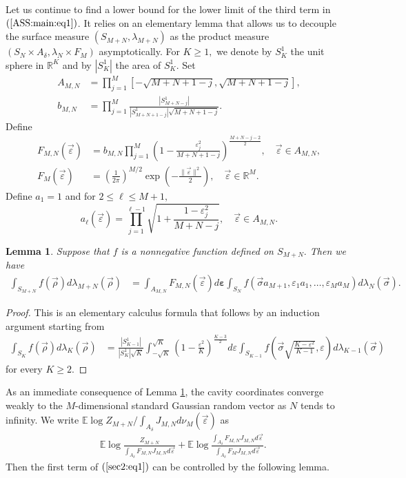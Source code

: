 \documentclass[12pt]{article}
\newcommand{\veps}{\vec{\varepsilon}}
\newcommand{\vsi}{{\vec{\sigma}}}
\newcommand{\vrho}{{\vec{\rho}}}
\newtheorem{lemma}{\bf Lemma}
\newenvironment{Proof of lemma}{\noindent{\bf Proof of Lemma}}{\hfill$\Box$\newline}
\newenvironment{Proof of theorem}{\noindent{\bf Proof of Theorem}}{\hfill{\footnotesize${\square}$}\newline}
\newenvironment{Proof of theorems}{\noindent{\bf Proof of Theorems}}{\hfill$\Box$\newline}
\newenvironment{Proof of proposition}{\noindent{\bf Proof of Proposition}}{\hfill$\Box$\newline}
\newenvironment{Proof of propositions}{\noindent{\bf Proof of Propositions}}{\hfill$\Box$\newline}
\newenvironment{Proof of exercise}{\noindent{\it Proof of Exercise:}}{\hfill$\Box$}
\numberwithin{equation}{section}
\begin{document}
\noindent Let us continue to find a lower bound for the lower limit of the third term in $(\ref{ASS:main:eq1})$. 
It relies on an elementary lemma that allows us to decouple the surface measure $(S_{M+N},\lambda_{M+N})$ as the product measure $(S_N\times A_\delta,\lambda_N\times F_M)$ asymptotically.
For $K\geq 1,$ we denote by $S_K^1$ the unit sphere in $\mathbb{R}^K$ and by $|S_K^1|$ the area of $S_K^1$.
Set
\begin{align*}
A_{M,N}&=\prod_{j=1}^M\left[-\sqrt{M+N+1-j},\sqrt{M+N+1-j}\right],\\
b_{M,N}&=\prod_{j=1}^M\frac{|S_{M+N-j}^1|}{|S_{M+N+1-j}^1|\sqrt{M+N+1-j}}.
\end{align*}
Define
\begin{align*}
F_{M,N}(\veps)&=b_{M,N}\prod_{j=1}^M\left(1-\frac{\varepsilon_j^2}{M+N+1-j}\right)^{\frac{M+N-j-2}{2}},\quad\veps\in A_{M,N},\\
F_M(\veps)&=\left(\frac{1}{2\pi}\right)^{M/2}\exp\left(-\frac{\|\veps\|^2}{2}\right),\quad\veps\in \mathbb{R}^M.
\end{align*}
Define $a_1=1$ and for $2\leq \ell\leq M+1,$
$$
a_\ell(\veps)=\prod_{j=1}^{\ell-1}\sqrt{1+\frac{1-\varepsilon_j^2}{M+N-j}},\quad \veps\in A_{M,N}.
$$

\begin{lemma}
\label{ASS:lem1}
Suppose that $f$ is a nonnegative function defined on $S_{M+N}.$ 
Then we have 
\begin{align}\label{ASS:lem1:eq1}
\int_{S_{M+N}}f(\vrho)d\lambda_{M+N}(\vrho)
&=\int_{A_{M,N}}
F_{M,N}(\veps)d\boldsymbol{\varepsilon}\int_{S_N}f\left(\vsi a_{M+1},\varepsilon_{1}a_{1},\ldots,\varepsilon_Ma_M\right)d\lambda_{N}(\vsi).
\end{align}
\end{lemma}

\begin{proof}
This is an elementary calculus formula that follows by an induction argument starting from  
\begin{align*}
\int_{S_K}f(\vrho)d\lambda_K(\vrho)&=\frac{|S_{K-1}^1|}{|S_K^1|\sqrt{K}}\int_{-\sqrt{K}}^{\sqrt{K}}\left(1-\frac{\varepsilon^2}{K}\right)^{\frac{K-3}{2}}d\varepsilon \int_{S_{K-1}}f\left(\vsi \sqrt{\frac{K-\varepsilon^2}{K-1}},\varepsilon\right)d\lambda_{K-1}(\vsi)
\end{align*}
for every $K\geq 2.$
\end{proof}

\noindent As an immediate consequence of Lemma \ref{ASS:lem1}, the cavity coordinates converge weakly to the $M$-dimensional standard Gaussian random vector as $N$ tends to infinity. We write $\mathbb{E}\log {Z_{M+N}}/{\int_{A_\delta}J_{M,N}d\nu_M(\veps)}$ as
\begin{align}\label{sec2:eq1}
&\mathbb{E}\log \frac{Z_{M+N}}{\int_{A_\delta}F_{M,N}J_{M,N}d\veps}+\mathbb{E}\log \frac{\int_{A_\delta}F_{M,N}J_{M,N}d\veps}{\int_{A_\delta}F_MJ_{M,N}d\veps}.
\end{align}
Then the first term of $(\ref{sec2:eq1})$ can be controlled by the following lemma.
  
\end{document}
